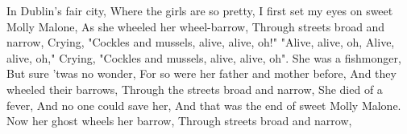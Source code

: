 \beginverse
In Dublin's fair city, Where the girls are so pretty,
I first set my eyes on sweet Molly Malone,
As she wheeled her wheel-barrow,
Through streets broad and narrow,
\endverse
\beginchorus
Crying, "Cockles and mussels, alive, alive, oh!"
"Alive, alive, oh, Alive, alive, oh,"
Crying,  "Cockles and mussels, alive, alive, oh".
\endchorus
\beginverse
She was a fishmonger, But sure 'twas no wonder,
For so were her father and mother before,
And they wheeled their barrows,
Through the streets broad and narrow,
\endverse
\beginverse
She died of a fever, And no one could save her,
And that was the end of sweet Molly Malone.
Now her ghost wheels her barrow,
Through streets broad and narrow,
\endverse
\endsong